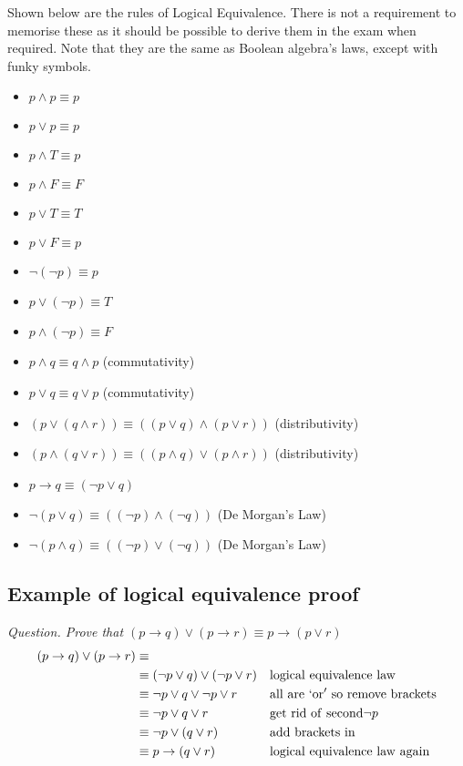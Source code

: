 Shown below are the rules of Logical Equivalence. There is not a requirement to memorise these as it should be possible to derive them in the exam when required. Note that they are the same as Boolean algebra's laws, except with funky symbols.
\begin{itemize}
    \item $p \wedge p \equiv p$
    \item $p \vee p \equiv p$
    \item $p \wedge T \equiv p$
    \item $p \wedge F \equiv F$
    \item $p \vee T \equiv T$
    \item $p \vee F \equiv p$
    \item $\neg (\neg p) \equiv p$
    \item $p \vee (\neg p) \equiv T$
    \item $p \wedge (\neg p) \equiv F$
    \item $p \wedge q \equiv q \wedge p$ (commutativity)
    \item $p \vee q \equiv q \vee p$ (commutativity)
    \item $(p \vee (q \wedge r)) \equiv ((p \vee q) \wedge (p \vee r))$ (distributivity)
    \item $(p \wedge (q \vee r)) \equiv ((p \wedge q) \vee (p \wedge r))$ (distributivity)
    \item $p \rightarrow q \equiv (\neg p \vee q)$
    \item $\neg (p \vee q) \equiv ((\neg p)\wedge(\neg q))$ (De Morgan's Law)
    \item $\neg (p \wedge q) \equiv ((\neg p)\vee(\neg q))$ (De Morgan's Law)
\end{itemize}

\subsection{Example of logical equivalence proof}
\textit{Question. Prove that $(p\rightarrow q) \vee (p \rightarrow r) \equiv p \rightarrow (p \vee r)$}
\begin{align*}
    (p\rightarrow q) \vee (p \rightarrow r) &\equiv  &&\\
    & \equiv (\neg p \vee q) \vee (\neg p \vee r) && \mathrm{logical\ equivalence\ law}\\
    & \equiv \neg p \vee q \vee \neg p \vee r && \mathrm{all\ are\ `or'\ so\ remove\ brackets}\\
    & \equiv \neg p \vee q \vee r && \mathrm{get\ rid\ of\ second} \neg p\\
    & \equiv \neg p \vee (q \vee r)&& \mathrm{add\ brackets\ in} \\
    & \equiv p \rightarrow (q \vee r) && \mathrm{logical\ equivalence\ law\ again}
\end{align*}

